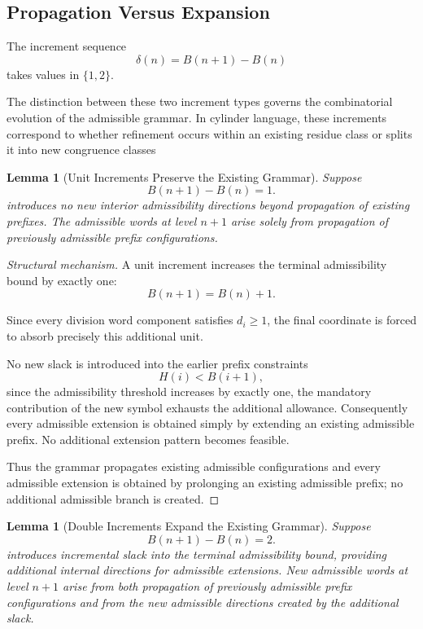 \documentclass[12pt, oneside]{article}
\numberwithin{equation}{section}
\theoremstyle{definition}
\theoremstyle{plain}
\newtheorem{lemma}[theorem]{Lemma}
\theoremstyle{remark}
\begin{document}
\subsection{Propagation Versus Expansion}

The increment sequence
\[
\delta(n)=B(n+1)-B(n)
\]
takes values in \(\{1,2\}\).

The distinction between these two increment types governs the
combinatorial evolution of the admissible grammar.  In cylinder
language, these increments correspond to whether refinement
occurs within an existing residue class or splits it into new
congruence classes

\begin{lemma}[Unit Increments Preserve the Existing Grammar]
\label{lem:single-no-new}
Suppose
\[
B(n+1)-B(n)=1.
\]
introduces no new interior admissibility directions beyond propagation
of existing prefixes. The admissible words at level \(n+1\) arise solely
from propagation of previously admissible prefix configurations.
\end{lemma}

\begin{proof}[Structural mechanism]
A unit increment increases the terminal admissibility bound by exactly
one:
\[
B(n+1)=B(n)+1.
\]

Since every division word component satisfies \(d_i\ge1\), the final
coordinate is forced to absorb precisely this additional unit.

No new slack is introduced into the earlier prefix constraints
\[
H(i)<B(i+1),
\]
since the admissibility threshold increases by exactly one, the
mandatory contribution of the new symbol exhausts the additional
allowance. Consequently every admissible extension is obtained
simply by extending an existing admissible prefix. No additional
extension pattern becomes feasible.

Thus the grammar propagates existing admissible configurations and
every admissible extension is obtained by prolonging an existing
admissible prefix; no additional admissible branch is created.
\end{proof}

\begin{lemma}[Double Increments Expand the Existing Grammar]
\label{lem:double-expand}
Suppose
\[
B(n+1)-B(n)=2.
\]
introduces incremental slack into the terminal admissibility bound, providing
additional internal directions for admissible extensions.  New admissible words
at level \(n+1\) arise from both propagation of previously admissible prefix
configurations and from the new admissible directions created by the additional slack.
\end{lemma}
\end{document}

